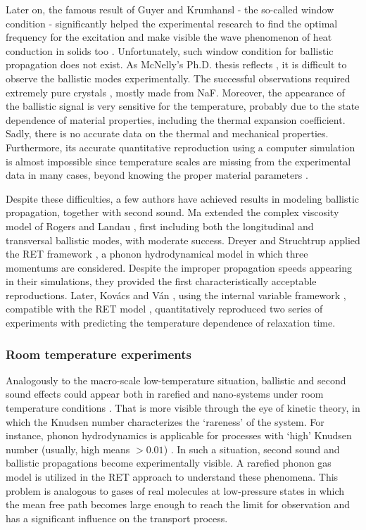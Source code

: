 \documentclass[sn-mathphys]{sn-jnl}%
\theoremstyle{thmstyleone}%
\theoremstyle{thmstyletwo}%
\theoremstyle{thmstylethree}%
\begin{document}
{Later on, the famous result of Guyer and Krumhansl - the so-called window condition - significantly helped the experimental research to find the optimal frequency for the excitation and make visible the wave phenomenon of heat conduction in solids too \cite{GK64, GK66}. Unfortunately, such window condition for ballistic propagation does not exist. As McNelly's Ph.D. thesis reflects \cite{McN74t}, it is difficult to observe the ballistic modes experimentally. The successful observations required extremely pure crystals \cite{Wal63}, mostly made from NaF. Moreover, the appearance of the ballistic signal is very sensitive for the temperature, probably due to the state dependence of material properties, including the thermal expansion coefficient. Sadly, there is no accurate data on the thermal and mechanical properties. Furthermore, its accurate quantitative reproduction using a computer simulation is almost impossible since temperature scales are missing from the experimental data in many cases, beyond knowing the proper material parameters \cite{KovVan16, KovVan18}.

Despite these difficulties, a few authors have achieved results in modeling ballistic propagation, together with second sound. Ma \cite{Ma13a1, Ma13a2} extended the complex viscosity model of Rogers \cite{Rog71a, Rog72a} and Landau \cite{LandauVIeng}, first including both the longitudinal and transversal ballistic modes, with moderate success. Dreyer and Struchtrup \cite{DreStr93a} applied the RET framework \cite{MulRug98b, RugSug15b}, a phonon hydrodynamical model in which three momentums are considered. Despite the improper propagation speeds appearing in their simulations, they provided the first characteristically acceptable reproductions. Later, Kov\'acs and V\'an \cite{KovVan18}, using the internal variable framework \cite{BerVan17b, JozsKov20b}, compatible with the RET model \cite{KovEta20a}, quantitatively reproduced two series of experiments with predicting the temperature dependence of relaxation time.

\subsubsection{Room temperature experiments}
Analogously to the macro-scale low-temperature situation, ballistic and second sound effects could appear both in rarefied and nano-systems under room temperature conditions \cite{Kov18rg}. That is more visible through the eye of kinetic theory, in which the Knudsen number characterizes the `rareness' of the system. For instance, phonon hydrodynamics is applicable for processes with `high' Knudsen number (usually, high means $>0.01$) \cite{Struc05}. In such a situation, second sound and ballistic propagations become experimentally visible. A rarefied phonon gas model is utilized in the RET approach to understand these phenomena. This problem is analogous to gases of real molecules at low-pressure states in which the mean free path becomes large enough to reach the limit for observation and has a significant influence on the transport process.

}
\end{document}
